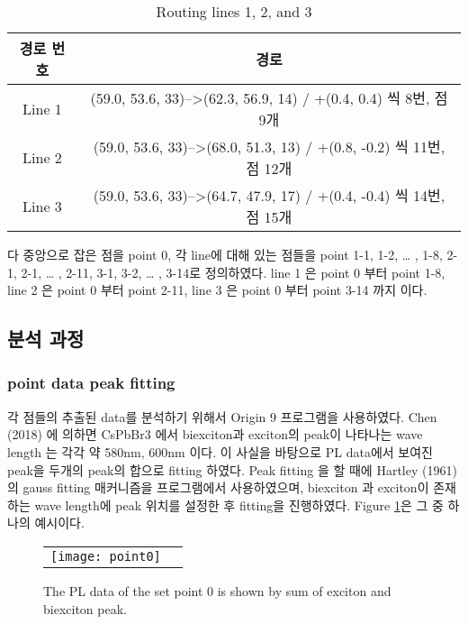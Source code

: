 \begin{table}[H]%
	\caption{Routing lines 1, 2, and 3}
	\label{table01}
	\centering
	\begin{tabular}{c c}
	\toprule
	경로 번호 & 경로\\
	\toprule
	Line 1 & (59.0, 53.6, 33)-->(62.3, 56.9, 14) / +(0.4, 0.4) 씩 8번, 점 9개\\
	Line 2 & (59.0, 53.6, 33)-->(68.0, 51.3, 13) / +(0.8, -0.2) 씩 11번, 점 12개\\
	Line 3 & (59.0, 53.6, 33)-->(64.7, 47.9, 17) / +(0.4, -0.4) 씩 14번, 점 15개\\
	\toprule
	\end{tabular}
	\end{table}
다
중앙으로 잡은 점을 point 0, 각 line에 대해 있는 점들을 point 1-1, 1-2, … , 1-8, 2-1, 2-1, … , 2-11, 3-1, 3-2, … , 3-14로 정의하였다. line 1 은 point 0 부터 point 1-8, line 2 은 point 0 부터 point 2-11, line 3 은 point 0 부터 point 3-14 까지 이다. 
\\

\subsection{분석 과정}
\subsubsection{point data peak fitting}
각 점들의 추출된 data를 분석하기 위해서 Origin 9 프로그램을 사용하였다. Chen (2018) 에 의하면 CsPbBr3 에서 biexciton과 exciton의 peak이 나타나는 wave length 는 각각 약 580nm, 600nm 이다\cite{chen2018room}. 이 사실을 바탕으로 PL data에서 보여진 peak을 두개의 peak의 합으로 fitting 하였다. Peak fitting 을 할 때에 Hartley (1961)의 gauss fitting 매커니즘을 프로그램에서 사용하였으며, biexciton 과 exciton이 존재하는 wave length에 peak 위치를 설정한 후 fitting을 진행하였다\cite{hartley1961modified}. Figure \ref{fig:point0}은 그 중 하나의 예시이다.

\begin{figure}[H]
	\begin{center}
		\begin{tabular}{cc}
			\texttt{[image: point0]}
		\end{tabular}
	\end{center}
	\caption{The PL data of the set point 0 is shown by sum of exciton and biexciton peak.}
	\label{fig:point0}  
\end{figure}

